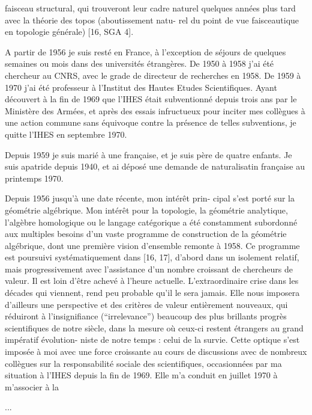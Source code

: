 faisceau  structural, qui trouveront leur cadre naturel quelques
années plus tard avec la théorie des topos (aboutissement natu-%
rel du point de vue faisceautique en topologie générale) [16,
SGA 4].

A partir de 1956 je suis resté en France, à l'exception
de séjours de quelques semaines ou mois dans des universités
étrangères. De 1950 à 1958 j'ai été chercheur au CNRS, avec le
grade de directeur de recherches en 1958. De 1959 à 1970 j'ai
été professeur à l'Institut des Hautes Etudes Scientifiques.
Ayant découvert à la fin de 1969 que l'IHES était subventionné
depuis trois ans par le Ministère des Armées, et après des essais
infructueux pour inciter mes collègues à une action commune sans
équivoque contre la présence de telles subventions, je quitte
l'IHES en septembre 1970.

Depuis 1959 je suis marié à une française, et je suis
père de quatre enfants. Je suis apatride depuis 1940, et ai
déposé une demande de naturalisatin française au printemps 1970.

Depuis 1956 jusqu'à une date récente, mon intérêt prin-%
cipal s'est porté sur la géométrie algébrique. Mon intérêt pour
la topologie, la géométrie analytique, l'algèbre homologique ou
le langage catégorique a été constamment subordonné aux multiples
besoins d'un vaste programme de construction de la géométrie
algébrique, dont une première vision d'ensemble remonte à 1958.
Ce programme est poursuivi systématiquement dans [16, 17], d'abord
dans un isolement relatif, mais progressivement avec l'assistance
d'un nombre croissant de chercheurs de valeur. Il est loin d'être
achevé à l'heure actuelle. L'extraordinaire crise  
 dans les décades qui viennent, rend peu
probable qu'il le sera jamais. Elle nous imposera d'ailleurs
une perspective et des critères de valeur entièrement nouveaux,
qui réduiront à l'insignifiance (``irrelevance'') beaucoup des
plus brillants progrès scientifiques de notre siècle, dans la
mesure où ceux-ci restent étrangers au grand impératif évolution-%
niste de notre temps : celui de la survie. Cette optique s'est
imposée à moi avec une force croissante au cours de discussions
avec de nombreux collègues sur la responsabilité sociale des
scientifiques, occasionnées par ma situation à l'IHES depuis la
fin de 1969. Elle m'a conduit en juillet 1970 à m'associer à la

 \hfill ...
